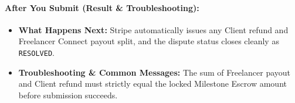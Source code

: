 \paragraph{After You Submit (Result \& Troubleshooting):}
\begin{itemize}[leftmargin=1.5em,itemsep=2pt]
  \item \textbf{What Happens Next:} Stripe automatically issues any Client refund and Freelancer Connect payout split, and the dispute status closes cleanly as \texttt{RESOLVED}.
  \item \textbf{Troubleshooting \& Common Messages:} The sum of Freelancer payout and Client refund must strictly equal the locked Milestone Escrow amount before submission succeeds.
\end{itemize}
